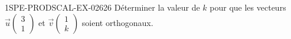 \begin{exercice}{1SPE-PRODSCAL-EX-026}{2}{6}
Déterminer la valeur de $k$ pour que les vecteurs $\vec{u}\begin{pmatrix} 3 \\ 1 \end{pmatrix}$ et $\vec{v}\begin{pmatrix} 1 \\ k \end{pmatrix}$ soient orthogonaux.
\end{exercice}

